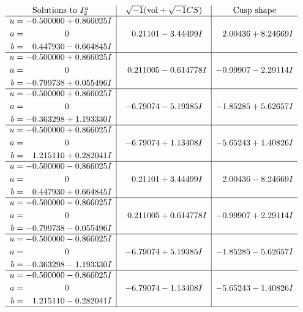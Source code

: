 \documentclass[1p]{elsarticle_modified}
\theoremstyle{definition}
\newcommand{\I}{\sqrt{-1}}
\begin{document}
$$\begin{array}{c|c|c}  
\text{Solutions to }I^u_{2}& \I (\text{vol} + \sqrt{-1}CS) & \text{Cusp shape}\\
 \hline 
\begin{aligned}
u &= -0.500000 + 0.866025 I \\
a &= \phantom{-0.000000 } 0 \\
b &= \phantom{-}0.447930 - 0.664845 I\end{aligned}
 & \phantom{-}0.21101 - 3.44499 I & \phantom{-}2.00436 + 8.24669 I \\ \hline\begin{aligned}
u &= -0.500000 + 0.866025 I \\
a &= \phantom{-0.000000 } 0 \\
b &= -0.799738 + 0.055496 I\end{aligned}
 & \phantom{-}0.211005 - 0.614778 I & -0.99907 - 2.29114 I \\ \hline\begin{aligned}
u &= -0.500000 + 0.866025 I \\
a &= \phantom{-0.000000 } 0 \\
b &= -0.363298 + 1.193330 I\end{aligned}
 & -6.79074 - 5.19385 I & -1.85285 + 5.62657 I \\ \hline\begin{aligned}
u &= -0.500000 + 0.866025 I \\
a &= \phantom{-0.000000 } 0 \\
b &= \phantom{-}1.215110 + 0.282041 I\end{aligned}
 & -6.79074 + 1.13408 I & -5.65243 + 1.40826 I \\ \hline\begin{aligned}
u &= -0.500000 - 0.866025 I \\
a &= \phantom{-0.000000 } 0 \\
b &= \phantom{-}0.447930 + 0.664845 I\end{aligned}
 & \phantom{-}0.21101 + 3.44499 I & \phantom{-}2.00436 - 8.24669 I \\ \hline\begin{aligned}
u &= -0.500000 - 0.866025 I \\
a &= \phantom{-0.000000 } 0 \\
b &= -0.799738 - 0.055496 I\end{aligned}
 & \phantom{-}0.211005 + 0.614778 I & -0.99907 + 2.29114 I \\ \hline\begin{aligned}
u &= -0.500000 - 0.866025 I \\
a &= \phantom{-0.000000 } 0 \\
b &= -0.363298 - 1.193330 I\end{aligned}
 & -6.79074 + 5.19385 I & -1.85285 - 5.62657 I \\ \hline\begin{aligned}
u &= -0.500000 - 0.866025 I \\
a &= \phantom{-0.000000 } 0 \\
b &= \phantom{-}1.215110 - 0.282041 I\end{aligned}
 & -6.79074 - 1.13408 I & -5.65243 - 1.40826 I\\
 \hline 
 \end{array}$$\newpage
\end{document}
